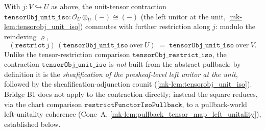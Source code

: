 \begin{lemma}\label{mk-lem:tensorobj_unit_iso_restrict_compat}
  \leanok

  With \(j : V \hookrightarrow U\) as above, the unit-tensor contraction
  \(\mathtt{tensorObj\_unit\_iso} : \mathcal{O}_U \otimes_U (-) \cong (-)\) (the left unitor at the
  unit, \ref{mk-lem:tensorobj_unit_iso}) commutes with further restriction along \(j\): modulo the
  reindexing \(\varrho\),
  \[
    (\mathtt{restrict}\,j)\,(\mathtt{tensorObj\_unit\_iso}\ \text{over}\ U)
      \;=\; \mathtt{tensorObj\_unit\_iso}\ \text{over}\ V.
  \]
  Unlike the tensor-restriction comparison \(\mathtt{tensorObj\_restrict\_iso}\), the contraction
  \(\mathtt{tensorObj\_unit\_iso}\) is \emph{not} built from the abstract pullback: by definition it
  is the \emph{sheafification of the presheaf-level left unitor at the unit}, followed by the
  sheafification-adjunction counit (\ref{mk-lem:tensorobj_unit_iso}). Bridge B1 does not apply to the
  contraction directly; instead the square reduces, via the chart comparison
  \(\mathtt{restrictFunctorIsoPullback}\), to a pullback-world left-unitality coherence (Cone~A,
  \ref{mk-lem:pullback_tensor_map_left_unitality}), established below.
\end{lemma}

